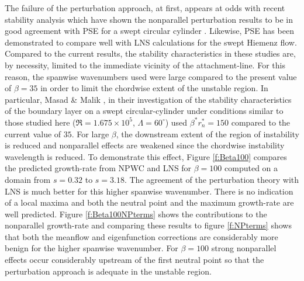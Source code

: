 The failure of the perturbation approach, at first, appears at odds with
recent stability analysis which have shown the nonparallel perturbation
results to be in good agreement with PSE for a swept circular cylinder
\cite{MaMa:94}.  Likewise, PSE has been demonstrated to compare well with LNS
calculations \cite{MaLiCh:94} for the swept Hiemenz flow.  Compared to the
current results, the stability characteristics in these studies are, by
necessity, limited to the immediate vicinity of the attachment-line.  For this
reason, the spanwise wavenumbers used were large compared to the present value
of $\beta = 35$ in order to limit the chordwise extent of the unstable region.
In particular, Masad \& Malik \cite{MaMa:94}, in their investigation of the
stability characteristics of the boundary layer on a swept circular-cylinder
under conditions similar to those studied here ($\Re=1.675\times 10^5$,
$\Lambda=60^\circ$) used $\beta^* r^*_n = 150$ compared to the current value
of $35$.  For large $\beta$, the downstream extent of the region of
instability is reduced and nonparallel effects are weakened since the
chordwise instability wavelength is reduced.  To demonstrate this effect,
Figure \ref{f:Beta100} compares the predicted growth-rate from NPWC and
LNS for $\beta = 100$ computed on a domain from $s=0.32$ to $s=3.18$.  The
agreement of the perturbation theory with LNS is much better for this higher
spanwise wavenumber.  There is no indication of a local maxima and both the
neutral point and the maximum growth-rate are well predicted.  Figure
\ref{f:Beta100NPterms} shows the contributions to the nonparallel growth-rate
and comparing these results to figure \ref{f:NPterms} shows that both the
meanflow and eigenfunction corrections are considerably more benign for the
higher spanwise wavenumber.  For $\beta=100$ strong nonparallel effects occur
considerably upstream of the first neutral point so that the perturbation
approach is adequate in the unstable region.

